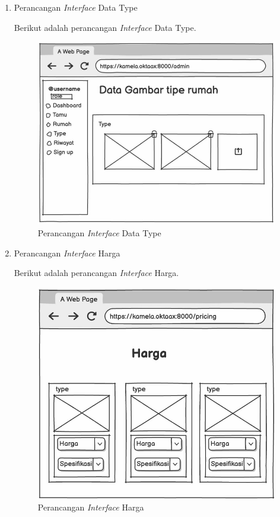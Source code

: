 \begin{enumerate}
        \item Perancangan \textit{Interface} Data Type
        \par Berikut adalah perancangan \textit{Interface} Data Type.
        \begin{figure}
            \centering
            \includegraphics[width=0.75\linewidth]{Wireframe/Data Tipe.png}
            \caption{Perancangan \textit{Interface} Data Type}
        \end{figure}
        
        \item Perancangan \textit{Interface} Harga
        \par Berikut adalah perancangan \textit{Interface} Harga.
        \begin{figure}
            \centering
            \includegraphics[width=0.75\linewidth]{Wireframe/Harga.png}
            \caption{Perancangan \textit{Interface} Harga}
        \end{figure}
        

\end{enumerate}
